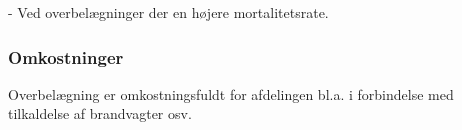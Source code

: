  
- Ved overbelægninger der en højere mortalitetsrate. 
\subsubsection{Omkostninger}
Overbelægning er omkostningsfuldt for afdelingen bl.a. i forbindelse med tilkaldelse af brandvagter osv.















